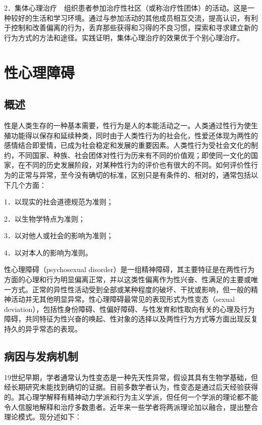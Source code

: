 2．集体心理治疗　组织患者参加治疗性社区（或称治疗性团体）的活动。这是一种较好的生活和学习环境。通过与参加活动的其他成员相互交流，提高认识，有利于控制和改善偏离的行为，丢弃那些获得和习得的不良习惯，探索和寻求建立新的行为方式的方法和途径。实践证明，集体心理治疗的效果优于个别心理治疗。

\section{性心理障碍}

\subsection{概述}

性是人类生存的一种基本需要，性行为是人的本能活动之一。人类通过性行为使生殖功能得以保存和延续种类，同时由于人类性行为的社会化，性爱还体现为两性的感情结合即爱情，已成为社会稳定和发展的重要因素。人类性行为受社会文化的制约，不同国家、种族、社会团体对性行为历来有不同的价值观；即使同一文化的国家，在不同的历史发展阶段，对某种性行为的评价也有很大的不同。如何评价性行为的正常与异常，至今没有确切的标准，区别只是有条件的、相对的，通常包括以下几个方面：

1．以现实的社会道德规范为准则；

2．以生物学特点为准则；

3．以对他人或社会的影响为准则；

4．以对本人的影响为准则。

性心理障碍（psychosexual
disorder）是一组精神障碍，其主要特征是在两性行为方面的心理和行为明显偏离正常，并以这类性偏离作为性兴奋、性满足的主要或唯一方式。正常的异性性活动受到全部或某种程度的破坏、干扰或影响，但一般的精神活动并无其他明显异常。性心理障碍最常见的表现形式为性变态（sexual
deviation），包括性身份障碍、性偏好障碍、与性发育和性取向有关的心理及行为障碍，共同特征为性兴奋的唤起、性对象的选择以及两性行为方式等方面出现反复持久的异乎常态的表现。

\subsection{病因与发病机制}

19世纪早期，学者通常认为性变态是一种先天性异常，假设其具有生物学基础，但经长期研究未能找到确切的证据。目前多数学者认为，性变态是通过后天经验获得的。其心理学解释有精神动力学派和行为主义学派，但任何一个学派的理论都不能令人信服地解释和治疗多数患者。近年来一些学者将两派理论加以融合，提出整合理论模式。现分述如下：

